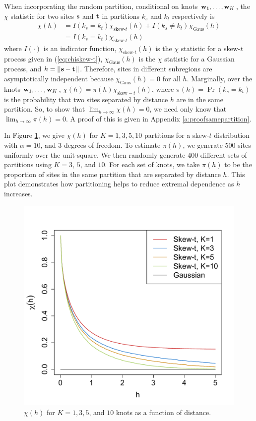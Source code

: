 \documentclass[11pt]{article}
\begin{document}
When incorporating the random partition, conditional on knots $\mbox{\bf w}_1, \ldots, \mbox{\bf w}_K$, the $\chi$ statistic for two sites $\mbox{\bf s}$ and $\mbox{\bf t}$ in partitions $k_s$ and $k_t$ respectively is
\begin{align}
  \chi(h) &= I(k_s = k_t) \chi_{\text{skew-}t}(h) + I(k_s \neq k_t) \chi_{\text{Gaus}}(h) \nonumber \\
         &= I(k_s = k_t) \chi_{\text{skew-}t}(h)
\end{align}
where $I(\cdot)$ is an indicator function, $\chi_{\text{skew-}t}(h)$ is the $\chi$ statistic for a skew-$t$ process given in (\ref{eq:chiskew-t}), $\chi_{\text{Gaus}}(h)$ is the $\chi$ statistic for a Gaussian process, and $h = ||\mbox{\bf s} - \mbox{\bf t}||$.
Therefore, sites in different subregions are asymptotically independent because $\chi_{\text{Gaus}}(h) = 0$ for all $h$.
Marginally, over the knots $\mbox{\bf w}_1, \ldots, \mbox{\bf w}_K$, $\chi(h) = \pi(h) \chi_{\text{skew}-t}(h)$, where $\pi(h) = \Pr(k_s = k_t)$ is the probability that two sites separated by distance $h$ are in the same partition.
So, to show that $\lim_{h \rightarrow \infty} \chi(h) = 0$, we need only know that $\lim_{h \rightarrow \infty} \pi(h) = 0$. A proof of this is given in Appendix \ref{a:proofsamepartition}.

In Figure \ref{fig:chi}, we give $\chi(h)$ for $K = 1, 3, 5, 10$ partitions for a skew-$t$ distribution with $\alpha = 10$, and 3 degrees of freedom.
To estimate $\pi(h)$, we generate 500 sites uniformly over the unit-square.
We then randomly generate 400 different sets of partitions using $K = 3$, $5$, and $10$.
For each set of knots, we take $\pi(h)$ to be the proportion of sites in the same partition that are separated by distance $h$.
This plot demonstrates how partitioning helps to reduce extremal dependence as $h$ increases.

\begin{figure}
  \centering
  \includegraphics[width=0.5\linewidth]{plots/chi-h.pdf}
  \caption{$\chi(h)$ for $K = 1, 3, 5$, and $10$ knots as a function of distance.}
  \label{fig:chi}
\end{figure}
\end{document}
